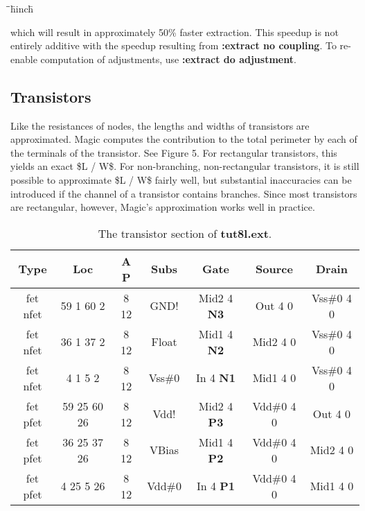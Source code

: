 \documentclass[letterpaper,twoside,12pt]{article}
\def\hinch{\hspace*{0.5in}}
\def\starti{\begin{center}\begin{tabbing}\hinch\=\hinch\=\hinch\=hinch\hinch\=\kill}
\def\endi{\end{tabbing}\end{center}}
\def\ii{\>\>\>}
\begin{document}
\starti
   \ii {\bfseries :extract no adjustment}
\endi

which will result in
approximately 50\% faster extraction.  This speedup is
not entirely additive with the speedup resulting from
{\bfseries :extract no coupling}.  To re-enable computation of adjustments, use
{\bfseries :extract do adjustment}.

\subsection{Transistors}

Like the resistances of nodes, the lengths and widths of transistors are
approximated.  Magic computes the contribution to the total perimeter
by each of the terminals of the transistor.  See Figure 5.
For rectangular transistors, this yields an exact \$L / W\$.
For non-branching, non-rectangular transistors, it is still
possible to approximate \$L / W\$ fairly well, but substantial
inaccuracies can be introduced if the channel of a transistor contains
branches.
Since most transistors are rectangular, however, Magic's approximation
works well in practice.

\begin{table}[ht]
   \begin{center}
      \begin{tabular}{|ccccccc|} \hline
	Type 	 & Loc         &  A  P & Subs & Gate & Source & Drain \\ \hline
	fet nfet & 59  1 60  2 &  8 12 & GND! & Mid2 4 {\bfseries N3}
		& Out 4 0    & Vss\#0 4 0 \\
	fet nfet & 36  1 37  2 &  8 12 & Float & Mid1 4 {\bfseries N2}
		& Mid2 4 0   & Vss\#0 4 0 \\
	fet nfet &  4  1  5  2 &  8 12 & Vss\#0 & In 4 {\bfseries N1}
		& Mid1 4 0   & Vss\#0 4 0 \\
	fet pfet & 59 25 60 26 &  8 12 & Vdd! & Mid2 4 {\bfseries P3}
		& Vdd\#0 4 0 & Out 4 0 \\
	fet pfet & 36 25 37 26 &  8 12 & VBias & Mid1 4 {\bfseries P2}
		& Vdd\#0 4 0 & Mid2 4 0 \\
	fet pfet &  4 25  5 26 &  8 12 & Vdd\#0 & In 4 {\bfseries P1}
		& Vdd\#0 4 0 & Mid1 4 0 \\ \hline
      \end{tabular}
      \caption{The transistor section of {\bfseries tut8l.ext}.}
   \end{center}
\end{table}
\end{document}

